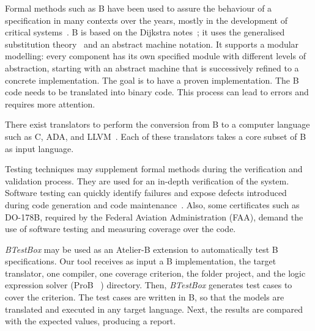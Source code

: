 \documentclass[runningheads]{llncs}
\begin{document}

Formal methods such as B have been used to assure the behaviour of a specification in many contexts over the years, mostly in the development of critical systems~\cite{leuschel:2005,valerio_thesis:2016}. 
B is based on the Dijkstra notes~\cite{dijkstra1976discipline}; it uses the generalised substitution theory~\cite{hoare2002proof} and an abstract machine notation. 
It supports a modular modelling:  every component has its own specified module with different levels of abstraction, starting with an abstract machine that is successively refined to a concrete implementation. 
The goal is to have a proven implementation. 
The B code needs to be translated into binary code.
This process can lead to errors and requires more attention. 



There exist translators to perform the conversion from B to a computer language such as C, ADA, and LLVM~\cite{deharbebtestbox}. 
Each of these translators takes a core subset of B as input language. 

Testing techniques may supplement formal methods during the verification and validation process. 
They are used for an in-depth verification of the system. 
Software testing can quickly identify failures and expose defects introduced during code generation and code maintenance~\cite{deharbebtestbox}. 
Also, some certificates such as DO-178B, required by the Federal Aviation Administration (FAA), demand the use of software testing and measuring coverage over the code.

 \textit{BTestBox} may be used as an Atelier-B extension to automatically test B specifications. 
Our tool receives as input a B implementation, the target translator, one compiler, one coverage criterion, the folder project, and the logic expression solver (ProB ~\cite{1_leuschel_2017}) %
directory. 
Then,  \textit{BTestBox} generates test cases to cover the criterion.
The test cases are written in B, so that the models are translated and executed in any target language. 
Next, the results are compared with the expected values, producing a report. 
\end{document}
